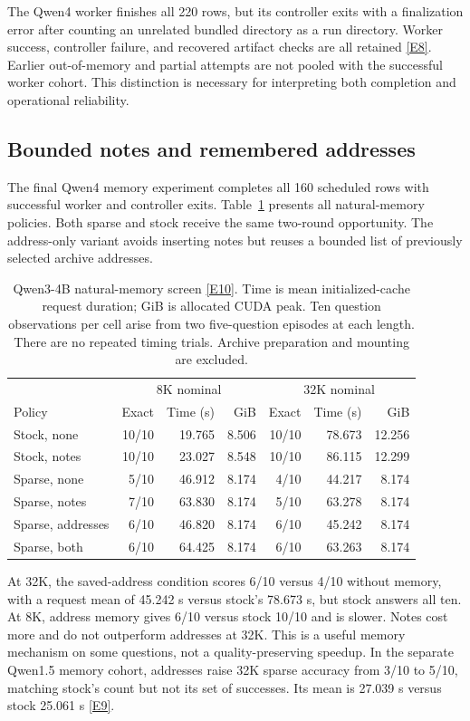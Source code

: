 \documentclass[11pt,letterpaper]{article}
\newcommand{\ev}[1]{\hyperref[app:evidence]{[E#1]}}
\begin{document}
The Qwen4 worker finishes all 220 rows, but its controller exits with a finalization error after counting an unrelated bundled directory as a run directory. Worker success, controller failure, and recovered artifact checks are all retained \ev{8}. Earlier out-of-memory and partial attempts are not pooled with the successful worker cohort. This distinction is necessary for interpreting both completion and operational reliability.

\subsection{Bounded notes and remembered addresses}
The final Qwen4 memory experiment completes all 160 scheduled rows with successful worker and controller exits. Table~\ref{tab:memory} presents all natural-memory policies. Both sparse and stock receive the same two-round opportunity. The address-only variant avoids inserting notes but reuses a bounded list of previously selected archive addresses.

\begin{table}[ht]
\centering\small
\begin{tabular}{lrrrrrr}
\toprule
 & \multicolumn{3}{c}{8K nominal} & \multicolumn{3}{c}{32K nominal}\\
Policy & Exact & Time (s) & GiB & Exact & Time (s) & GiB\\\midrule
Stock, none & 10/10 & 19.765 & 8.506 & 10/10 & 78.673 & 12.256\\
Stock, notes & 10/10 & 23.027 & 8.548 & 10/10 & 86.115 & 12.299\\
Sparse, none & 5/10 & 46.912 & 8.174 & 4/10 & 44.217 & 8.174\\
Sparse, notes & 7/10 & 63.830 & 8.174 & 5/10 & 63.278 & 8.174\\
Sparse, addresses & 6/10 & 46.820 & 8.174 & 6/10 & 45.242 & 8.174\\
Sparse, both & 6/10 & 64.425 & 8.174 & 6/10 & 63.263 & 8.174\\\bottomrule
\end{tabular}
\caption{Qwen3-4B natural-memory screen \ev{10}. Time is mean initialized-cache request duration; GiB is allocated CUDA peak. Ten question observations per cell arise from two five-question episodes at each length. There are no repeated timing trials. Archive preparation and mounting are excluded.}\label{tab:memory}
\end{table}

At 32K, the saved-address condition scores 6/10 versus 4/10 without memory, with a request mean of 45.242 s versus stock's 78.673 s, but stock answers all ten. At 8K, address memory gives 6/10 versus stock 10/10 and is slower. Notes cost more and do not outperform addresses at 32K. This is a useful memory mechanism on some questions, not a quality-preserving speedup. In the separate Qwen1.5 memory cohort, addresses raise 32K sparse accuracy from 3/10 to 5/10, matching stock's count but not its set of successes. Its mean is 27.039 s versus stock 25.061 s \ev{9}.
\end{document}
